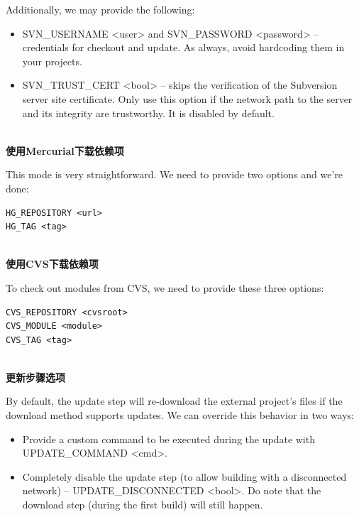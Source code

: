 Additionally, we may provide the following:

\begin{itemize}
\item 
SVN\_USERNAME <user> and SVN\_PASSWORD <password> – credentials for checkout and update. As always, avoid hardcoding them in your projects.
	
\item 
SVN\_TRUST\_CERT <bool> – skips the verification of the Subversion server site certificate. Only use this option if the network path to the server and its integrity are trustworthy. It is disabled by default.
\end{itemize}

\hspace*{\fill} \\ %
\noindent
\textbf{使用Mercurial下载依赖项}

This mode is very straightforward. We need to provide two options and we're done:

\begin{lstlisting}[style=styleCMake]
HG_REPOSITORY <url>
HG_TAG <tag>
\end{lstlisting} 

\hspace*{\fill} \\ %
\noindent
\textbf{使用CVS下载依赖项}

To check out modules from CVS, we need to provide these three options:

\begin{lstlisting}[style=styleCMake]
CVS_REPOSITORY <cvsroot>
CVS_MODULE <module>
CVS_TAG <tag>
\end{lstlisting} 

\hspace*{\fill} \\ %
\noindent
\textbf{更新步骤选项}

By default, the update step will re-download the external project's files if the download method supports updates. We can override this behavior in two ways:

\begin{itemize}
\item 
Provide a custom command to be executed during the update with UPDATE\_COMMAND <cmd>.

\item 
Completely disable the update step (to allow building with a disconnected network) – UPDATE\_DISCONNECTED <bool>. Do note that the download step (during the first build) will still happen.
\end{itemize}

